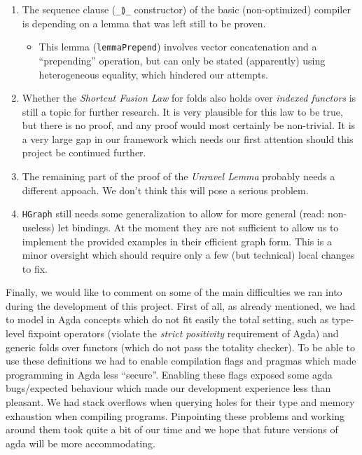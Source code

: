 \documentclass[a4paper]{article}
\begin{document}
        \begin{enumerate}
            \item The sequence clause (\texttt{\_⟫\_} constructor) of the basic (non-optimized) compiler
                is depending on a lemma that was left still to be proven.
                \begin{itemize}
                    \item This lemma (\texttt{lemmaPrepend}) involves vector concatenation and a ``prepending'' operation,
                        but can only be stated (apparently) using heterogeneous equality, which hindered our attempts.
                \end{itemize}
                
            \item Whether the \emph{Shortcut Fusion Law} for folds also holds over \emph{indexed functors} is still a topic for further research. It
                  is very plausible for this law to be true, but there is no proof, and any proof would most certainly be non-trivial. It is a very large
                  gap in our framework which needs our first attention should this project be continued further.

            \item The remaining part of the proof of the \emph{Unravel Lemma} probably needs a different appoach. We don't think this will pose a serious
                  problem.
            \item \texttt{HGraph} still needs some generalization to allow for more general (read: non-useless) let bindings. At the moment they are not
                  sufficient to allow us to implement the provided examples in their efficient graph form. This is a minor oversight which should require only
                  a few (but technical) local changes to fix.
        \end{enumerate}

        Finally, we would like to comment on some of the main difficulties we ran into during the
        development of this project. First of all, as already mentioned, we had to model in Agda concepts which
        do not fit easily the total setting, such as type-level fixpoint operators (violate the
        \emph{strict positivity} requirement of Agda) and generic folds over functors (which do not pass
        the totality checker). To be able to use these definitions we had to enable compilation flags and pragmas
        which made programming in Agda less ``secure''. Enabling these flags exposed some agda bugs/expected behaviour which made our 
        development experience less than pleasant. We had stack overflows when querying holes for their type and memory exhaustion when compiling
        programs. Pinpointing these problems and working around them took quite a bit of our time and we hope that future versions of agda will be
        more accommodating.


    
    
\end{document}
